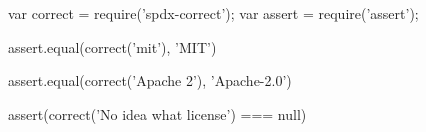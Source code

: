 
\begin{DoxyCode}
var correct = require('spdx-correct');
var assert = require('assert');

assert.equal(correct('mit'), 'MIT')

assert.equal(correct('Apache 2'), 'Apache-2.0')

assert(correct('No idea what license') === null)
\end{DoxyCode}
 